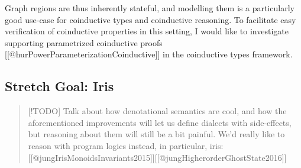 \documentclass[a4paper]{article}
\begin{document}
Graph regions are thus inherently stateful, and modelling them is a
particularly good use-case for coinductive types and coinductive
reasoning. To facilitate easy verification of coinductive properties in
this setting, I would like to investigate supporting parametrized
coinductive proofs {[}{[}@hurPowerParameterizationCoinductive{]}{]} in
the coinductive types framework.

\hypertarget{stretch-goal-iris}{%
\subsection{Stretch Goal: Iris}\label{stretch-goal-iris}}

\begin{quote}
{[}!TODO{]} Talk about how denotational semantics are cool, and how the
aforementioned improvements will let us define dialects with
side-effects, but reasoning about them will still be a bit painful. We'd
really like to reason with program logics instead, in particular, iris:
{[}{[}@jungIrisMonoidsInvariants2015{]}{]}{[}{[}@jungHigherorderGhostState2016{]}{]}
\end{quote}


% 











\end{document}
